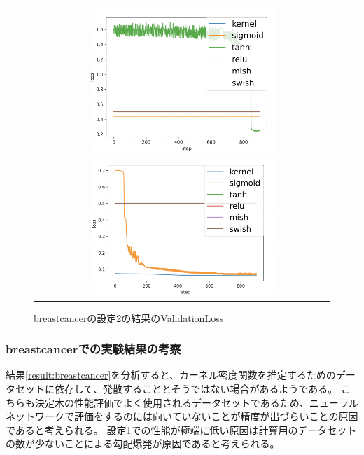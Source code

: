 \begin{figure}[hbtp]
    \begin{center}
        \begin{tabular}{c}
            \begin{minipage}{0.5\hsize}
                \includegraphics[clip, width=7cm]{asset/breastcancer_0.001_1000_3_005_sgd_non_kaiming_uniform}
                    \caption{breastcancerの設定1の結果のValidationLoss}
                    \label{breastcancer:loss_image1}
            \end{minipage}
            \hspace{10pt}
            \begin{minipage}{0.5\hsize}
                \includegraphics[clip, width=7cm]{asset/breastcancer_0.001_1000_3_05_sgd_non_kaiming_uniform}
                    \caption{breastcancerの設定2の結果のValidationLoss}
                    \label{breastcancer:loss_image2}
            \end{minipage}
        \end{tabular}
    \end{center}
\end{figure}


\subsubsection{breastcancerでの実験結果の考察}
結果\ref{result:breastcancer}を分析すると、カーネル密度関数を推定するためのデータセットに依存して、発散することとそうではない場合があるようである。
こちらも決定木の性能評価でよく使用されるデータセットであるため、ニューラルネットワークで評価をするのには向いていないことが精度が出づらいことの原因であると考えられる。
設定1での性能が極端に低い原因は計算用のデータセットの数が少ないことによる勾配爆発が原因であると考えられる。

